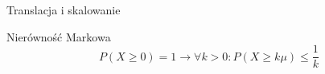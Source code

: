 \documentclass{mp}
\begin{document}
\begin{frame}{Translacja i skalowanie}
\begin{center}
\end{center}
\end{frame}

\begin{frame}{Nierówność Markowa}
\[ P(X\geq 0)=1 \to \forall k>0\colon P(X\geq k\mu)\leq \frac{1}{k} \]
\end{frame}
\end{document}
